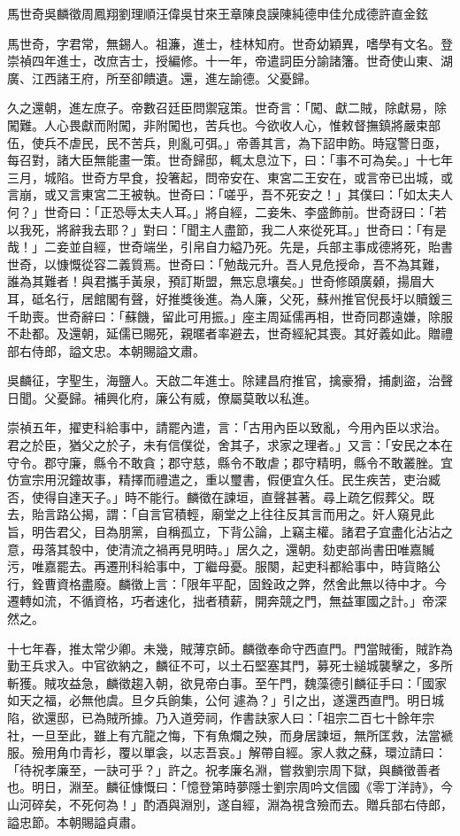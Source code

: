 
\begin{pinyinscope}
馬世奇吳麟徵周鳳翔劉理順汪偉吳甘來王章陳良謨陳純德申佳允成德許直金鉉

馬世奇，字君常，無錫人。祖濂，進士，桂林知府。世奇幼穎異，嗜學有文名。登崇禎四年進士，改庶吉士，授編修。十一年，帝遣詞臣分諭諸籓。世奇使山東、湖廣、江西諸王府，所至卻饋遺。還，進左諭德。父憂歸。

久之還朝，進左庶子。帝數召廷臣問禦寇策。世奇言：「闖、獻二賊，除獻易，除闖難。人心畏獻而附闖，非附闖也，苦兵也。今欲收人心，惟敕督撫鎮將嚴束部伍，使兵不虐民，民不苦兵，則亂可弭。」帝善其言，為下詔申飭。時寇警日亟，每召對，諸大臣無能畫一策。世奇歸邸，輒太息泣下，曰：「事不可為矣。」十七年三月，城陷。世奇方早食，投箸起，問帝安在、東宮二王安在，或言帝已出城，或言崩，或又言東宮二王被執。世奇曰：「嗟乎，吾不死安之！」其僕曰：「如太夫人何？」世奇曰：「正恐辱太夫人耳。」將自經，二妾朱、李盛飾前。世奇訝曰：「若以我死，將辭我去耶？」對曰：「聞主人盡節，我二人來從死耳。」世奇曰：「有是哉！」二妾並自經，世奇端坐，引帛自力縊乃死。先是，兵部主事成德將死，貽書世奇，以慷慨從容二義質焉。世奇曰：「勉哉元升。吾人見危授命，吾不為其難，誰為其難者！與君攜手黃泉，預訂斯盟，無忘息壤矣。」世奇修頤廣顙，揚眉大耳，砥名行，居館閣有聲，好推獎後進。為人廉，父死，蘇州推官倪長圩以贖鍰三千助喪。世奇辭曰：「蘇饑，留此可用振。」座主周延儒再相，世奇同郡遠嫌，除服不赴都。及還朝，延儒已賜死，親暱者率避去，世奇經紀其喪。其好義如此。贈禮部右侍郎，謚文忠。本朝賜謚文肅。

吳麟征，字聖生，海鹽人。天啟二年進士。除建昌府推官，擒豪猾，捕劇盜，治聲日聞。父憂歸。補興化府，廉公有威，僚屬莫敢以私進。

崇禎五年，擢吏科給事中，請罷內遣，言：「古用內臣以致亂，今用內臣以求治。君之於臣，猶父之於子，未有信僕從，舍其子，求家之理者。」又言：「安民之本在守令。郡守廉，縣令不敢貪；郡守慈，縣令不敢虐；郡守精明，縣令不敢叢脞。宜仿宣宗用況鐘故事，精擇而禮遣之，重以璽書，假便宜久任。民生疾苦，吏治臧否，使得自達天子。」時不能行。麟徵在諫垣，直聲甚著。尋上疏乞假葬父。既去，貽言路公揭，謂：「自言官積輕，廟堂之上往往反其言而用之。奸人窺見此旨，明告君父，目為朋黨，自稱孤立，下背公論，上竊主權。諸君子宜盡化沾沾之意，毋落其彀中，使清流之禍再見明時。」居久之，還朝。劾吏部尚書田唯嘉贓污，唯嘉罷去。再遷刑科給事中，丁繼母憂。服闋，起吏科都給事中，時貨賂公行，銓曹資格盡廢。麟徵上言：「限年平配，固銓政之弊，然舍此無以待中才。今遷轉如流，不循資格，巧者速化，拙者積薪，開奔競之門，無益軍國之計。」帝深然之。

十七年春，推太常少卿。未幾，賊薄京師。麟徵奉命守西直門。門當賊衝，賊詐為勤王兵求入。中官欲納之，麟征不可，以土石堅塞其門，募死士縋城襲擊之，多所斬獲。賊攻益急，麟徵趨入朝，欲見帝白事。至午門，魏藻德引麟征手曰：「國家如天之福，必無他虞。旦夕兵餉集，公何遽為？」引之出，遂還西直門。明日城陷，欲還邸，已為賊所據。乃入道旁祠，作書訣家人曰：「祖宗二百七十餘年宗社，一旦至此，雖上有亢龍之悔，下有魚爛之殃，而身居諫垣，無所匡救，法當褫服。殮用角巾青衫，覆以單衾，以志吾哀。」解帶自經。家人救之蘇，環泣請曰：「待祝孝廉至，一訣可乎？」許之。祝孝廉名淵，嘗救劉宗周下獄，與麟徵善者也。明日，淵至。麟征慷慨曰：「憶登第時夢隱士劉宗周吟文信國《零丁洋詩》，今山河碎矣，不死何為！」酌酒與淵別，遂自經，淵為視含殮而去。贈兵部右侍郎，謚忠節。本朝賜謚貞肅。


\end{pinyinscope}
